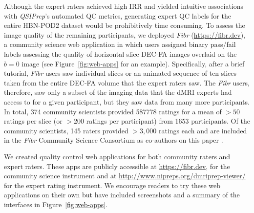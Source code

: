 \documentclass[fleqn,10pt,inline]{wlscirep}
\begin{document}
Although the expert raters achieved high IRR and yielded intuitive associations
with \emph{QSIPrep}'s automated QC metrics, generating expert QC labels for the
entire HBN-POD2 dataset would be prohibitively time consuming. To assess the
image quality of the remaining participants, we deployed \emph{Fibr}
(\url{https://fibr.dev}), a community science web application in which users
assigned binary pass/fail labels assessing the quality of horizontal slice DEC-FA
images overlaid on the $b=0$ image (see Figure~\ref{fig:web-apps} for an example).
Specifically, after a brief tutorial, \emph{Fibr} users saw individual
slices or an animated sequence of ten slices taken from the entire DEC-FA volume
that the expert raters saw. The \emph{Fibr} users, therefore, saw only a subset of
the imaging data that the dMRI experts had access to for a given participant, but they
saw data from many more participants. In total, \num{374} community scientists provided
\num{587778} ratings for a mean of $>50$ ratings per slice (or $>200$ ratings
per participant) from \num{1653} participants. Of the community scientists, \num{145}
raters provided $>3,000$ ratings each and are included in the \emph{Fibr} Community
Science Consortium as co-authors on this paper \cite{Ward-Fear2020-zq}.

We created quality control web applications for both community raters and expert raters. These apps are publicly accessible at \url{https://fibr.dev}, for the community science instrument and at \url{http://www.nipreps.org/dmriprep-viewer/} for the expert rating instrument. We encourage readers to try these web applications on their own but have included screenshots and a summary of the interfaces in Figure~\ref{fig:web-apps}.
\end{document}
